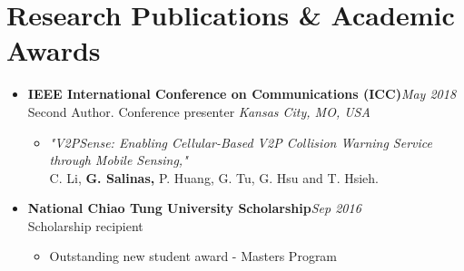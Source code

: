 \section{\sectionheading Research Publications \& Academic Awards}

\begin{itemize}[leftmargin=0pt, label={}]%

\item{
{\sectionheading\large{\textbf{IEEE International Conference on Communications (ICC)}}}\hfill {\sectionheading\small{\textit{May 2018}}}\\
{\sectionheading\small{Second Author. Conference presenter}}\hfill
{\sectionheading\small{\textit{Kansas City, MO, USA}}}

    \vspace{-6pt}
    \begin{itemize}[label=\textbullet, leftmargin=*, noitemsep]
        \item{
        \textit{"V2PSense: Enabling Cellular-Based V2P Collision Warning Service through Mobile Sensing,"}\\
        C. Li, \textbf{G. Salinas,} P. Huang, G. Tu, G. Hsu and T. Hsieh.
        }
    \end{itemize}
}

\item{
{\sectionheading\large{\textbf{National Chiao Tung University Scholarship}}}\hfill {\sectionheading\small{\textit{Sep 2016}}}\\
{\sectionheading\small{Scholarship recipient}}\hfill

    \vspace{-6pt}
    \begin{itemize}[label=\textbullet, leftmargin=*, noitemsep]%
        \item{Outstanding new student award - Masters Program}
    \end{itemize}
}


\end{itemize}
